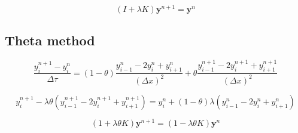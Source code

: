 \begin{equation}
  (I + \lambda K)\boldsymbol{y}^{n+1} = \boldsymbol{y}^{n}
\end{equation}

\subsection{Theta method}

\begin{equation}
  \frac{y^{n+1}_{i} - y^{n}_{i}}{\Delta \tau} = (1-\theta)\frac{y^{n}_{i-1} - 2y^{n}_{i} + y^{n}_{i+1}}{(\Delta x)^2} +  \theta\frac{y^{n+1}_{i-1} - 2y^{n+1}_{i} + y^{n+1}_{i+1}}{(\Delta x)^2}
\end{equation}

\begin{equation}
  y^{n+1}_{i} - \lambda\theta(y^{n+1}_{i-1} - 2y^{n+1}_{i} + y^{n+1}_{i+1}) =  y^{n}_{i} + (1-\theta)\lambda(y^{n}_{i-1} - 2y^{n}_{i} + y^{n}_{i+1})
\end{equation}

\begin{equation}
  (1 + \lambda\theta K)\boldsymbol{y}^{n+1} = (1-\lambda\theta K)\boldsymbol{y}^{n} 
\end{equation}
